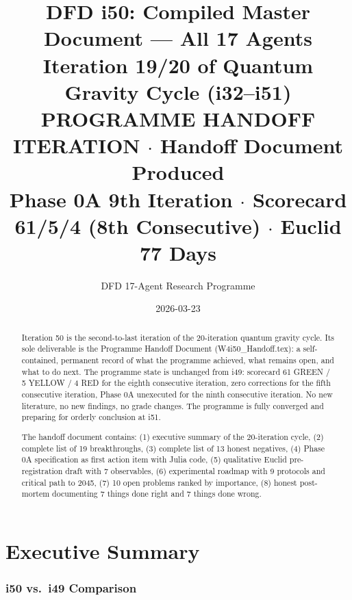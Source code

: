 \documentclass[11pt,a4paper]{article}
\title{DFD i50: Compiled Master Document --- All 17 Agents\\[6pt]
\large Iteration 19/20 of Quantum Gravity Cycle (i32--i51)\\[6pt]
\normalsize \textbf{PROGRAMME HANDOFF ITERATION} $\cdot$ Handoff Document Produced\\[3pt]
\normalsize Phase 0A 9th Iteration $\cdot$ Scorecard 61/5/4 (8th Consecutive) $\cdot$ Euclid 77 Days}
\author{DFD 17-Agent Research Programme}
\date{2026-03-23}
\begin{document}
\maketitle

\begin{abstract}
Iteration 50 is the second-to-last iteration of the 20-iteration quantum gravity cycle. Its sole deliverable is the Programme Handoff Document (W4i50\_Handoff.tex): a self-contained, permanent record of what the programme achieved, what remains open, and what to do next. The programme state is unchanged from i49: scorecard 61 GREEN / 5 YELLOW / 4 RED for the eighth consecutive iteration, zero corrections for the fifth consecutive iteration, Phase 0A unexecuted for the ninth consecutive iteration. No new literature, no new findings, no grade changes. The programme is fully converged and preparing for orderly conclusion at i51.

The handoff document contains: (1) executive summary of the 20-iteration cycle, (2) complete list of 19 breakthroughs, (3) complete list of 13 honest negatives, (4) Phase 0A specification as first action item with Julia code, (5) qualitative Euclid pre-registration draft with 7 observables, (6) experimental roadmap with 9 protocols and critical path to 2045, (7) 10 open problems ranked by importance, (8) honest post-mortem documenting 7 things done right and 7 things done wrong.
\end{abstract}

\tableofcontents
\newpage

\part{Executive Summary}

\section{i50 vs.\ i49 Comparison}
\end{document}
